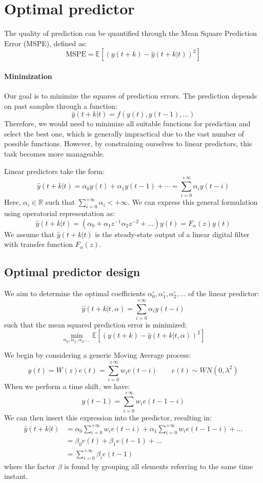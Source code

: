 \section{Optimal predictor}

The quality of prediction can be quantified through the Mean Square Prediction Error (MSPE), defined as:
\[\text{MSPE}=\mathbb{E}\left[ {\left(y(t+k)-\hat{y}(t+k|t) \right)}^2 \right]\]

\paragraph*{Minimization}
Our goal is to minimize the squares of prediction errors. 
The prediction depends on past samples through a function:
\[\hat{y}(t+k|t)=f(y(t),y(t-1),\dots)\]
Therefore, we would need to minimize all suitable functions for prediction and select the best one, which is generally impractical due to the vast number of possible functions. 
However, by constraining ourselves to linear predictors, this task becomes more manageable.

Linear predictors take the form:
\[\hat{y}(t+k|t)=\alpha_0y(t)+\alpha_1y(t-1)+\cdots=\sum_{i=0}^{+\infty}\alpha_i y(t-i)\]
Here, $\alpha_i \in \mathbb{R}$ such that $\sum_{i=0}^{+\infty}\alpha_i<+\infty$. 
We can express this general formulation using operatorial representation as:
\[\hat{y}(t+k|t)=\left(\alpha_0+\alpha_1z^{-1}\alpha_2z^{-2}+\dots\right)y(t)=F_{\alpha}(z)y(t)\]
We assume that $\hat{y}(t+k|t)$ is the steady-state output of a linear digital filter with transfer function $F_{\alpha}(z)$.

\subsection{Optimal predictor design}
We aim to determine the optimal coefficients $\alpha_0^{\circ},\alpha_1^{\circ},\alpha_2^{\circ},\dots$ of the linear predictor:
\[\hat{y}(t+k|t,\alpha)=\sum_{i=0}^{+\infty}\alpha_i y(t-i)\]
such that the mean squared prediction error is minimized:
\[\min_{\alpha_0,\alpha_1,\alpha_2,\dots}\mathbb{E}\left[{\left( y(t+k)-\hat{y}(t+k|t,\alpha) \right)}^2\right] \]

We begin by considering a generic Moving Average process:
\[y(t)=W(z)e(t) =\sum_{i=0}^{+\infty}w_i e(t-i) \qquad e(t)\sim WN(0,\lambda^2)\]
When we perform a time shift, we have:
\[y(t-1)=\sum_{i=0}^{+\infty}w_i e(t-1-i)\]
We can then insert this expression into the predictor, resulting in:
\begin{align*}
    \hat{y}(t+k|t)  &=\alpha_0\sum_{i=0}^{+\infty}w_i e(t-i)+\alpha_1\sum_{i=0}^{+\infty}w_i e(t-1-i)+\dots \\
                    &=\beta_0e(t)+\beta_1e(t-1)+\dots \\
                    &=\sum_{i=0}^{+\infty}\beta_i e(t-1)
\end{align*}
where the factor $\beta$ is found by grouping all elements referring to the same time instant.

